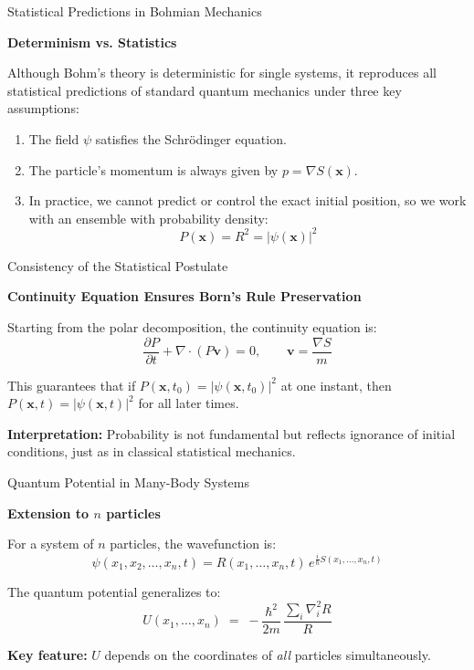 \begin{frame}{Statistical Predictions in Bohmian Mechanics}

  \textbf{Determinism vs. Statistics}


  Although Bohm’s theory is deterministic for single systems,  
  it reproduces all statistical predictions of standard quantum mechanics  
  under three key assumptions:

  \pause
  \begin{enumerate}
    \item The field $\psi$ satisfies the Schrödinger equation.  
    \pause
    \item The particle’s momentum is always given by $p = \nabla S(\mathbf{x})$.  
    \pause
    \item In practice, we cannot predict or control the exact initial position,  
          so we work with an ensemble with probability density:
          \[
            P(\mathbf{x}) = R^2 = |\psi(\mathbf{x})|^2
          \]
  \end{enumerate}

\end{frame}

\begin{frame}{Consistency of the Statistical Postulate}

  \textbf{Continuity Equation Ensures Born’s Rule Preservation}

  \pause
  Starting from the polar decomposition, the continuity equation is:
  \[
    \frac{\partial P}{\partial t} + \nabla \cdot (P \mathbf{v}) = 0,
    \qquad \mathbf{v} = \frac{\nabla S}{m}
  \]

  \pause
  This guarantees that if $P(\mathbf{x},t_0) = |\psi(\mathbf{x},t_0)|^2$  
  at one instant, then $P(\mathbf{x},t) = |\psi(\mathbf{x},t)|^2$  
  for all later times.

  \pause
  \textbf{Interpretation:}  
  Probability is not fundamental but reflects ignorance of initial conditions,  
  just as in classical statistical mechanics.  

\end{frame}


\begin{frame}{Quantum Potential in Many-Body Systems}

\textbf{Extension to $n$ particles}

\pause
For a system of $n$ particles, the wavefunction is:
\[
\psi(x_1, x_2, \dots, x_n, t) = R(x_1, \dots, x_n,t)\, e^{\tfrac{i}{\hbar} S(x_1, \dots, x_n,t)}
\]

\pause
The quantum potential generalizes to:
\[
U(x_1, \dots, x_n) \;=\; -\frac{\hbar^2}{2m} \, \frac{\sum_i \nabla_i^2 R}{R}
\]

\pause
\textbf{Key feature:} $U$ depends on the coordinates of \emph{all} particles simultaneously.  

\end{frame}

